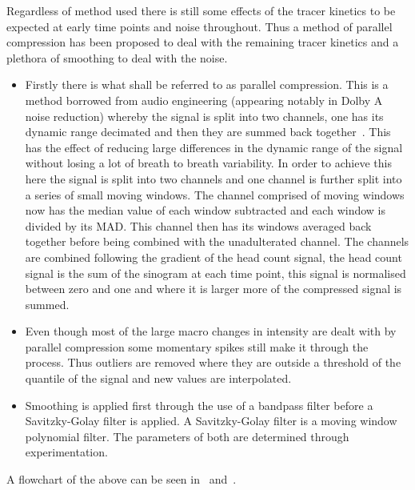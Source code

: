                     Regardless of method used there is still some effects of the tracer kinetics to be expected at early time points and noise throughout. Thus a method of parallel compression has been proposed to deal with the remaining tracer kinetics and a plethora of smoothing to deal with the noise.
                    
                    \begin{itemize}
                        \item Firstly there is what shall be referred to as parallel compression. This is a method borrowed from audio engineering (appearing notably in Dolby A noise reduction) whereby the signal is split into two channels, one has its dynamic range decimated and then they are summed back together~. This has the effect of reducing large differences in the dynamic range of the signal without losing a lot of breath to breath variability. In order to achieve this here the signal is split into two channels and one channel is further split into a series of small moving windows. The channel comprised of moving windows now has the median value of each window subtracted and each window is divided by its \gls{MAD}. This channel then has its windows averaged back together before being combined with the unadulterated channel. The channels are combined following the gradient of the head count signal, the head count signal is the sum of the sinogram at each time point, this signal is normalised between zero and one and where it is larger more of the compressed signal is summed.
                        
                        \item Even though most of the large macro changes in intensity are dealt with by parallel compression some momentary spikes still make it through the process. Thus outliers are removed where they are outside a threshold of the quantile of the signal and new values are interpolated.
                        
                        \item Smoothing is applied first through the use of a bandpass filter before a Savitzky-Golay filter is applied. A Savitzky-Golay filter is a moving window polynomial filter. The parameters of both are determined through experimentation.
                    \end{itemize}
                    
                    A flowchart of the above can be seen in~ and~.
            
